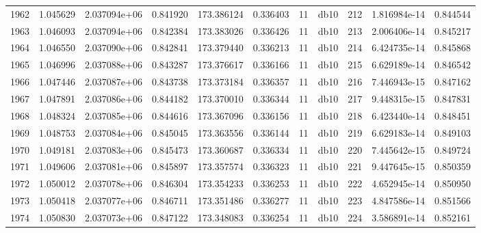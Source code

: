 \begin{tabular}{lrrrrrrlrrr}
1962 &    1.045629 &        2.037094e+06 &  0.841920 &              173.386124 &    0.336403 &      11 &         db10 &    212 &   1.816984e-14 &      0.844544 \\
1963 &    1.046093 &        2.037094e+06 &  0.842384 &              173.383026 &    0.336426 &      11 &         db10 &    213 &   2.006406e-14 &      0.845217 \\
1964 &    1.046550 &        2.037090e+06 &  0.842841 &              173.379440 &    0.336213 &      11 &         db10 &    214 &   6.424735e-14 &      0.845868 \\
1965 &    1.046996 &        2.037088e+06 &  0.843287 &              173.376617 &    0.336166 &      11 &         db10 &    215 &   6.629189e-14 &      0.846542 \\
1966 &    1.047446 &        2.037087e+06 &  0.843738 &              173.373184 &    0.336357 &      11 &         db10 &    216 &   7.446943e-15 &      0.847162 \\
1967 &    1.047891 &        2.037086e+06 &  0.844182 &              173.370010 &    0.336344 &      11 &         db10 &    217 &   9.448315e-15 &      0.847831 \\
1968 &    1.048324 &        2.037085e+06 &  0.844616 &              173.367096 &    0.336156 &      11 &         db10 &    218 &   6.423440e-14 &      0.848451 \\
1969 &    1.048753 &        2.037084e+06 &  0.845045 &              173.363556 &    0.336144 &      11 &         db10 &    219 &   6.629183e-14 &      0.849103 \\
1970 &    1.049181 &        2.037083e+06 &  0.845473 &              173.360687 &    0.336334 &      11 &         db10 &    220 &   7.445642e-15 &      0.849724 \\
1971 &    1.049606 &        2.037081e+06 &  0.845897 &              173.357574 &    0.336323 &      11 &         db10 &    221 &   9.447645e-15 &      0.850359 \\
1972 &    1.050012 &        2.037078e+06 &  0.846304 &              173.354233 &    0.336253 &      11 &         db10 &    222 &   4.652945e-14 &      0.850950 \\
1973 &    1.050418 &        2.037077e+06 &  0.846711 &              173.351486 &    0.336277 &      11 &         db10 &    223 &   4.847586e-14 &      0.851566 \\
1974 &    1.050830 &        2.037073e+06 &  0.847122 &              173.348083 &    0.336254 &      11 &         db10 &    224 &   3.586891e-14 &      0.852161 \\

\end{tabular}
